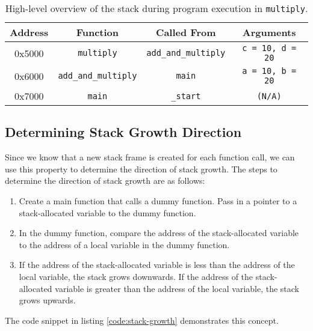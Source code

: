 \documentclass[main.tex]{subfiles}
\begin{document}
\begin{table}[H]
    \centering
    \begin{tabular}{|c|c|c|c|}
    \hline
    \textbf{Address} & \textbf{Function}            & \textbf{Called From}   & \textbf{Arguments}        \\ \hline
    0x5000           & \texttt{multiply}           & \texttt{add\_and\_multiply} & \texttt{c = 10, d = 20}   \\ \hline
    0x6000           & \texttt{add\_and\_multiply} & \texttt{main}           & \texttt{a = 10, b = 20}   \\ \hline
    0x7000           & \texttt{main}               & \texttt{\_start}        & \texttt{(N/A)}            \\ \hline
    \end{tabular}
    \caption{High-level overview of the stack during program execution in \texttt{multiply}.}
    \label{table:stack_overview}
\end{table}

\subsection{Determining Stack Growth Direction}
Since we know that a new stack frame is created for each function call, we can use this property to determine the direction of stack growth. The steps to determine the direction of stack growth are as follows:
\begin{enumerate}
    \item Create a main function that calls a dummy function. Pass in a pointer to a stack-allocated variable to the dummy function.
    \item In the dummy function, compare the address of the stack-allocated variable to the address of a local variable in the dummy function.
    \item If the address of the stack-allocated variable is less than the address of the local variable, the stack grows downwards. If the address of the stack-allocated variable is greater than the address of the local variable, the stack grows upwards.
\end{enumerate}
\noindent The code snippet in listing \ref{code:stack-growth} demonstrates this concept.


    
\end{document}
